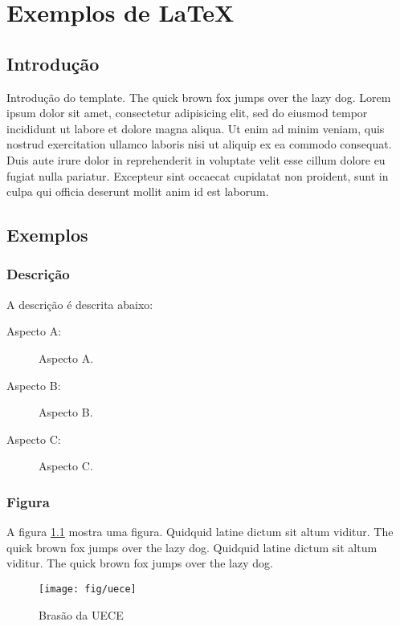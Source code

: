 \chapter{Exemplos de \LaTeX}


\section{Introdução}

Introdução do template. The quick brown fox jumps over the lazy dog. Lorem
ipsum dolor sit amet, consectetur adipisicing elit, sed do eiusmod tempor
incididunt ut labore et dolore magna aliqua. Ut enim ad minim veniam, quis
nostrud exercitation ullamco laboris nisi ut aliquip ex ea commodo consequat.
Duis aute irure dolor in reprehenderit in voluptate velit esse cillum dolore eu
fugiat nulla pariatur. Excepteur sint occaecat cupidatat non proident, sunt in
culpa qui officia deserunt mollit anim id est laborum.


\section{Exemplos}


\subsection{Descrição}

A descrição é descrita abaixo:

\begin{description}
\item[Aspecto A:] Aspecto A.
\item[Aspecto B:] Aspecto B.
\item[Aspecto C:] Aspecto C.
\end{description}


\subsection{Figura}

A figura \ref{fig:graph} mostra uma figura. Quidquid latine dictum sit altum
viditur. The quick brown fox jumps over the lazy dog. Quidquid latine dictum
sit altum viditur. The quick brown fox jumps over the lazy dog.

\begin{figure}[htbp]
\centering
\texttt{[image: fig/uece]}
\caption{Brasão da UECE}
\label{fig:graph}
\end{figure}


